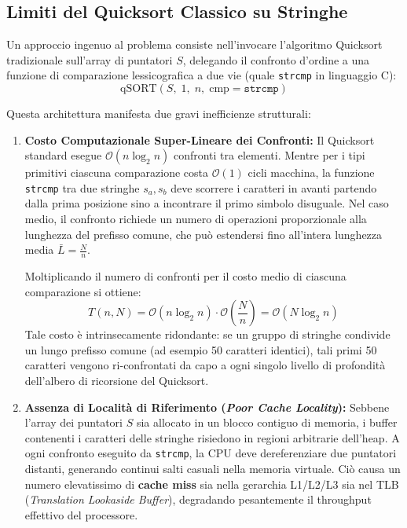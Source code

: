 \FloatBarrier
\subsection{Limiti del Quicksort Classico su Stringhe}
\label{subsec:limiti-quicksort-classico}

Un approccio ingenuo al problema consiste nell'invocare l'algoritmo Quicksort tradizionale sull'array di puntatori $S$, delegando il confronto d'ordine a una funzione di comparazione lessicografica a due vie (quale \texttt{strcmp} in linguaggio C):
\begin{equation}
  \text{qSORT}(S, \; 1, \; n, \; \text{cmp} = \texttt{strcmp})
\end{equation}

Questa architettura manifesta due gravi inefficienze strutturali:

\begin{enumerate}
  \item \textbf{Costo Computazionale Super-Lineare dei Confronti:}
  Il Quicksort standard esegue $\mathcal{O}(n \log_2 n)$ confronti tra elementi. Mentre per i tipi primitivi ciascuna comparazione costa $\mathcal{O}(1)$ cicli macchina, la funzione \texttt{strcmp} tra due stringhe $s_a, s_b$ deve scorrere i caratteri in avanti partendo dalla prima posizione sino a incontrare il primo simbolo disuguale. Nel caso medio, il confronto richiede un numero di operazioni proporzionale alla lunghezza del prefisso comune, che pu\`o estendersi fino all'intera lunghezza media $\bar{L} = \frac{N}{n}$. 
  
  Moltiplicando il numero di confronti per il costo medio di ciascuna comparazione si ottiene:
  \begin{equation}
    T(n, N) = \mathcal{O}(n \log_2 n) \cdot \mathcal{O}\left( \frac{N}{n} \right) = \mathcal{O}(N \log_2 n)
  \end{equation}
  Tale costo \`e intrinsecamente ridondante: se un gruppo di stringhe condivide un lungo prefisso comune (ad esempio 50 caratteri identici), tali primi 50 caratteri vengono ri-confrontati da capo a ogni singolo livello di profondit\`a dell'albero di ricorsione del Quicksort.
  
  \item \textbf{Assenza di Localit\`a di Riferimento (\textit{Poor Cache Locality}):}
  Sebbene l'array dei puntatori $S$ sia allocato in un blocco contiguo di memoria, i buffer contenenti i caratteri delle stringhe risiedono in regioni arbitrarie dell'heap. A ogni confronto eseguito da \texttt{strcmp}, la CPU deve dereferenziare due puntatori distanti, generando continui salti casuali nella memoria virtuale. Ci\`o causa un numero elevatissimo di \textbf{cache miss} sia nella gerarchia L1/L2/L3 sia nel TLB (\textit{Translation Lookaside Buffer}), degradando pesantemente il throughput effettivo del processore.
\end{enumerate}

